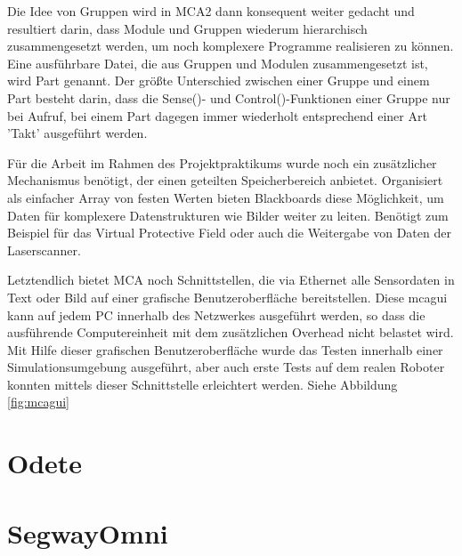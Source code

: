 Die Idee von Gruppen wird in MCA2 dann konsequent weiter gedacht und resultiert darin,
 dass Module und Gruppen wiederum hierarchisch zusammengesetzt werden, um noch komplexere Programme realisieren zu können.
 Eine ausführbare Datei, die aus Gruppen und Modulen zusammengesetzt ist, wird Part genannt.
 Der größte Unterschied zwischen einer Gruppe und einem Part besteht darin, dass die Sense()- und Control()-Funktionen einer Gruppe nur bei Aufruf,
 bei einem Part dagegen immer wiederholt entsprechend einer Art 'Takt' ausgeführt werden.

Für die Arbeit im Rahmen des Projektpraktikums wurde noch ein zusätzlicher Mechanismus benötigt,
 der einen geteilten Speicherbereich anbietet. Organisiert als einfacher Array von festen Werten bieten Blackboards diese Möglichkeit,
 um Daten für komplexere Datenstrukturen wie Bilder weiter zu leiten.
 Benötigt zum Beispiel für das Virtual Protective Field oder auch die Weitergabe von Daten der Laserscanner.

Letztendlich bietet MCA noch Schnittstellen, die via Ethernet alle Sensordaten in Text oder Bild auf einer grafische Benutzeroberfläche bereitstellen.
 Diese mcagui kann auf jedem PC innerhalb des Netzwerkes ausgeführt werden, so dass die ausführende Computereinheit
 mit dem zusätzlichen Overhead nicht belastet wird. Mit Hilfe dieser grafischen Benutzeroberfläche wurde das Testen
 innerhalb einer Simulationsumgebung ausgeführt, aber auch erste Tests auf dem realen Roboter konnten mittels dieser Schnittstelle erleichtert werden.
 Siehe Abbildung \ref{fig:mcagui} \citep{mca}


\section{Odete}
\authorsection{\editordirk}


\section{SegwayOmni}
\authorsection{\editordirk}

